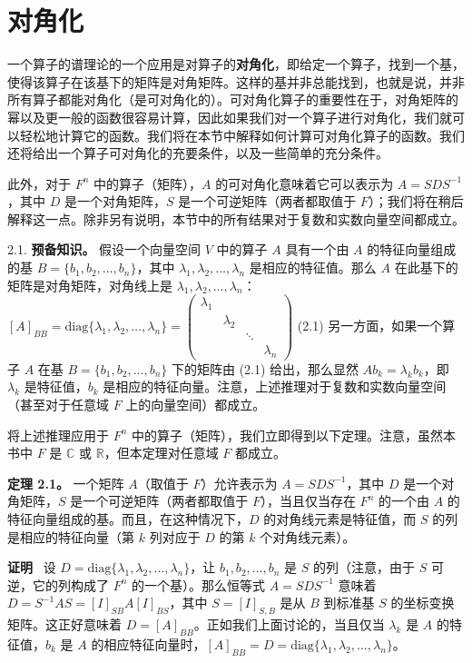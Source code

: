 \section{对角化}
一个算子的谱理论的一个应用是对算子的\textbf{对角化}，即给定一个算子，找到一个基，使得该算子在该基下的矩阵是对角矩阵。这样的基并非总能找到，也就是说，并非所有算子都能对角化（是可对角化的）。可对角化算子的重要性在于，对角矩阵的幂以及更一般的函数很容易计算，因此如果我们对一个算子进行对角化，我们就可以轻松地计算它的函数。我们将在本节中解释如何计算可对角化算子的函数。我们还将给出一个算子可对角化的充要条件，以及一些简单的充分条件。

此外，对于 $F^n$ 中的算子（矩阵），$A$ 的可对角化意味着它可以表示为 $A = SDS^{-1}$，其中 $D$ 是一个对角矩阵，$S$ 是一个可逆矩阵（两者都取值于 $F$）；我们将在稍后解释这一点。除非另有说明，本节中的所有结果对于复数和实数向量空间都成立。

2.1. \textbf{预备知识。} 假设一个向量空间 $V$ 中的算子 $A$ 具有一个由 $A$ 的特征向量组成的基 $B = \{b_1, b_2, \dots, b_n\}$，其中 $\lambda_1, \lambda_2, \dots, \lambda_n$ 是相应的特征值。那么 $A$ 在此基下的矩阵是对角矩阵，对角线上是 $\lambda_1, \lambda_2, \dots, \lambda_n$：
$[A]_{BB} = \text{diag}\{\lambda_1, \lambda_2, \dots, \lambda_n\} = \begin{pmatrix} \lambda_1 & & & \\ & \lambda_2 & & \\ & & \ddots & \\ & & & \lambda_n \end{pmatrix}$ (2.1)
另一方面，如果一个算子 $A$ 在基 $B = \{b_1, b_2, \dots, b_n\}$ 下的矩阵由 (2.1) 给出，那么显然 $Ab_k = \lambda_k b_k$，即 $\lambda_k$ 是特征值，$b_k$ 是相应的特征向量。注意，上述推理对于复数和实数向量空间（甚至对于任意域 $F$ 上的向量空间）都成立。

将上述推理应用于 $F^n$ 中的算子（矩阵），我们立即得到以下定理。注意，虽然本书中 $F$ 是 $\mathbb{C}$ 或 $\mathbb{R}$，但本定理对任意域 $F$ 都成立。

\textbf{定理 2.1。} 一个矩阵 $A$（取值于 $F$）允许表示为 $A = SDS^{-1}$，其中 $D$ 是一个对角矩阵，$S$ 是一个可逆矩阵（两者都取值于 $F$），当且仅当存在 $F^n$ 的一个由 $A$ 的特征向量组成的基。而且，在这种情况下，$D$ 的对角线元素是特征值，而 $S$ 的列是相应的特征向量（第 $k$ 列对应于 $D$ 的第 $k$ 个对角线元素）。

\textbf{证明}~ 设 $D = \text{diag}\{\lambda_1, \lambda_2, \dots, \lambda_n\}$，让 $b_1, b_2, \dots, b_n$ 是 $S$ 的列（注意，由于 $S$ 可逆，它的列构成了 $F^n$ 的一个基）。那么恒等式 $A = SDS^{-1}$ 意味着 $D = S^{-1}AS = [I]_{SB}A[I]_{BS}$，其中 $S = [I]_{S,B}$ 是从 $B$ 到标准基 $S$ 的坐标变换矩阵。这正好意味着 $D = [A]_{BB}$。正如我们上面讨论的，当且仅当 $\lambda_k$ 是 $A$ 的特征值，$b_k$ 是 $A$ 的相应特征向量时，$[A]_{BB} = D = \text{diag}\{\lambda_1, \lambda_2, \dots, \lambda_n\}$。

